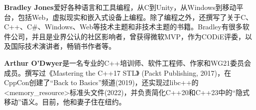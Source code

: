 \textbf{Bradley Jones}爱好各种语言和工具编程，从C到Unity，从Windows到移动平台，包括Web，虚拟现实和嵌入式设备上编程。除了编程之外，还撰写了关于C、C++、C\#、Windows、Web等技术主题和非技术主题的书籍。Bradley有很多软件公司，并且是业界公认的社区影响者，曾获得微软MVP，作为CODiE评委，以及国际技术演讲者，畅销书作者等。

\textbf{Arthur O'Dwyer}是一名专业的C++培训师、软件工程师、作家和WG21委员会成员。撰写过《Mastering the C++17 STL》 (Packt Publishing, 2017)，在CppCon创建了“Back to Basics”频道(2019)，还实现过libc++的<memory\_resource>标准头文件(2022)，并负责简化C++20和C++23中的“隐式移动”语义。目前，他和妻子住在纽约。